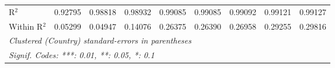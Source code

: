 \begin{table}[htbp]
\begin{tabular}{lcccccccc}
      R$^2$                                                            & 0.92795       & 0.98818  & 0.98932      & 0.99085        & 0.99085        & 0.99092               & 0.99121        & 0.99127\\  
      Within R$^2$                                                     & 0.05299       & 0.04947  & 0.14076      & 0.26375        & 0.26390        & 0.26958               & 0.29255        & 0.29816\\  
      \midrule \midrule
      \multicolumn{9}{l}{\emph{Clustered (Country) standard-errors in parentheses}}\\
      \multicolumn{9}{l}{\emph{Signif. Codes: ***: 0.01, **: 0.05, *: 0.1}}\\
   \end{tabular}
\end{table}


